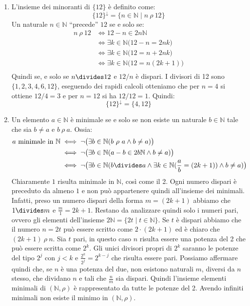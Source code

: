 \begin{enumerate}[label=(\textit{\roman*})]
	\item L'insieme dei minoranti di $\{12\}$ è definito come:
	\begin{displaymath}
		\{12\}^{\downarrow} = \{ n \in \mathbb{N} \; | \; n \ \rho \ 12 \}
	\end{displaymath}
	Un naturale $n \in \mathbb{N}$ ``precede'' $12$ se e solo se:
	\begin{align*}
		n \ \rho \ 12 &\iff 12 -n  \in 2n\mathbb{N} \\
		&\iff \exists k \in \mathbb{N} \bigl(12 -n = 2nk\bigr)\\
		&\iff \exists k \in \mathbb{N} \bigl(12 = n +2nk\bigr)\\
		&\iff \exists k \in \mathbb{N} \bigl(12 = n(2k+1)\bigr)\\
	\end{align*}
Quindi se, e solo se $n \divides 12$ e $12/n$ è dispari. I divisori di 12 sono $\{1,2,3,4,6,12\}$, eseguendo dei rapidi calcoli otteniamo che per $n=4$ si ottiene $12/4=3$ e per $n=12$ si ha $12/12=1$. Quindi:
\begin{displaymath}
	\{12\}^{\downarrow} = \{4,12\}
\end{displaymath}
\item Un elemento $a \in \mathbb{N}$ è minimale se e solo se non esiste un naturale $b \in \mathbb{N}$ tale che sia $b \neq a$ e $b \ \rho \ a$. Ossia:
\begin{align*}
	a \ \text{minimale in $\mathbb{N}$} &\iff \neg \bigl(\exists b \in \mathbb{N}( b \ \rho \ a \land b \neq a)\bigr) \\
	&\iff \neg \bigl(\exists b \in \mathbb{N}( a-b \in 2b\mathbb{N} \land b \neq a)\bigr) \\ 
	&\iff \neg \bigl(\exists b \in \mathbb{N}( b \divides a \land \exists k \in \mathbb{N}(\frac{a}{b} = (2k+1)) \land b \neq a)\bigr) \\
\end{align*}
Chiaramente $1$ risulta minimale in $\mathbb{N}$, così come il 2. Ogni numero dispari è preceduto da almeno $1$ e non può appartenere quindi all'insieme dei minimali. Infatti, preso un numero dispari della forma $m= (2k+1)$ abbiamo che $1 \divides m$ e $\frac{m}{1} = 2k+1$. Restano da analizzare quindi solo i numeri pari, ovvero gli elementi dell'insieme $2\mathbb{N}=\{2t \; | \; t \in \mathbb{N} \}$. Se $t$ è dispari abbiamo che il numero $n = 2t$ può essere scritto come $2 \cdot (2k+1)$ ed è chiaro che $(2k+1) \ \rho \ n$. Sia $t$ pari, in questo caso $n$ risulta essere una potenza del 2 che può essere scritta come $2^{k}$. Gli unici divisori propri di $2^{k}$ saranno le potenze del tipo $2^{j}$ con $j < k$ e $\frac{2^{k}}{2^{j}}=2^{k-j}$ che risulta essere pari. Possiamo affermare quindi che, se $n$ è una potenza del due, non esistono naturali $m$, diversi da $n$ stesso, che dividano $n$ e tali che $\frac{n}{m}$ sia dispari. Quindi l'insieme elementi minimali di $(\mathbb{N},\rho)$ è rappresentato da tutte le potenze del 2. Avendo infiniti minimali non esiste il minimo in $(\mathbb{N},\rho)$. 


\end{enumerate}
